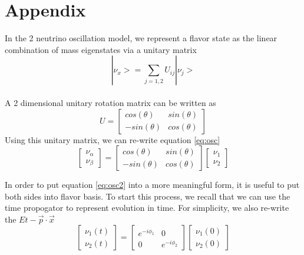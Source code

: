 \documentclass[12pt]{article}
\begin{document}
\section{Appendix}
In the 2 neutrino oscillation model, we represent a flavor state as the linear combination of mass eigenstates via a unitary matrix
\begin{equation} \label{eq:osc}
|\nu_x> = \sum_{j=1,2} U_{ij} |\nu_j>  
\end{equation}
\\ A 2 dimensional unitary rotation matrix can be written as 
\begin{equation}
U = \begin{bmatrix}
cos(\theta) & sin(\theta)
\\ -sin(\theta)& cos(\theta)
\end{bmatrix}
\end{equation}
Using this unitary matrix, we can re-write equation \ref{eq:osc} 
\begin{equation} \label{eq:osc2}
 \begin{bmatrix}
 \nu_\alpha
 \\ \nu_\beta
 \end{bmatrix}
 = \begin{bmatrix}
cos(\theta) & sin(\theta)
\\ -sin(\theta)& cos(\theta)
\end{bmatrix} 
 \begin{bmatrix}
 \nu_1
 \\ \nu_2
 \end{bmatrix}
\end{equation}


In order to put equation \ref{eq:osc2} into a more meaningful form, it is useful to put both sides into flavor basis. To start this process, we recall that we can use the time propogator to represent evolution in time. For simplicity, we also re-write the $Et - \vec{p}\cdot\vec{x}$
\begin{equation} \label{eq:prop}
 \begin{bmatrix}
 \nu_1(t)
 \\ \nu_2(t)
 \end{bmatrix}
 = \begin{bmatrix}
e^{-i\phi_1} & 0
\\ 0 & e^{-i\phi_2}
\end{bmatrix} 
 \begin{bmatrix}
 \nu_1(0)
 \\ \nu_2(0)
 \end{bmatrix}
\end{equation}
\end{document}
